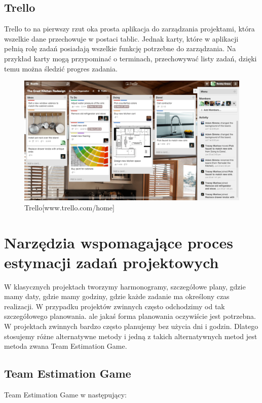\subsection{Trello}

Trello to na pierwszy rzut oka prosta aplikacja do zarządzania projektami,
która wszelkie dane przechowuje w postaci tablic.
Jednak karty, które w aplikacji pełnią rolę zadań posiadają wszelkie funkcję potrzebne do zarządzania.
Na przykład karty mogą przypominać o terminach, przechowywać listy zadań,
dzięki temu można śledzić progres zadania.

\begin{figure}[H]
	\centering\includegraphics[width=.8\textwidth]{img/01}
	\caption{Trello[www.trello.com/home]}\label{rys:trello}%
\end{figure}

\section{Narzędzia wspomagające proces estymacji zadań projektowych}

W klasycznych projektach tworzymy harmonogramy, szczegółowe plany, gdzie mamy daty,
gdzie mamy godziny, gdzie każde zadanie ma określony czas realizacji.
W przypadku projektów zwinnych często odchodzimy od tak szczegółowego planowania.
ale jakaś forma planowania oczywiście jest potrzebna.
W projektach zwinnych bardzo często planujemy bez użycia dni i godzin.
Dlatego stosujemy różne alternatywne metody i jedną z takich alternatywnych metod
jest metoda zwana Team Estimation Game.

\subsection{Team Estimation Game}

Team Estimation Game w następujący:

